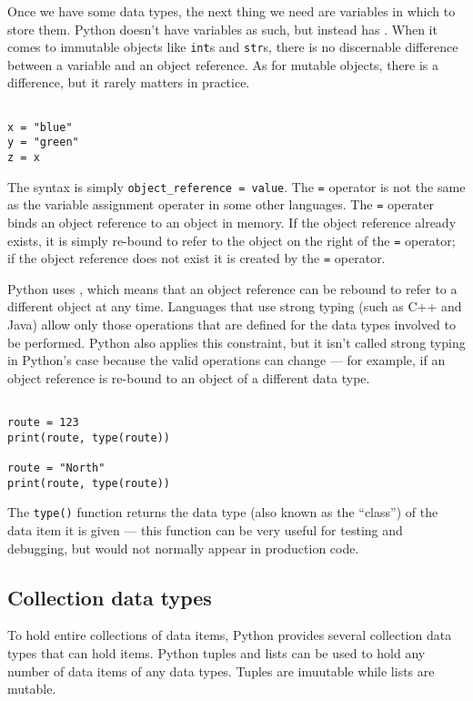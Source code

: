 Once we have some data types, the next thing we need are variables in which to store them.
Python doesn't have variables as such, but instead has .
When it comes to immutable objects like \verb|int|s and \verb|str|s, there is no discernable difference between a variable and an object reference.
As for mutable objects, there is a difference, but it rarely matters in practice.



\begin{lstlisting}

x = "blue"
y = "green"
z = x
\end{lstlisting}


The syntax is simply \verb|object_reference = value|.
The \verb|=| operator is not the same as the variable assignment operater in some other languages.
The \verb|=| operater binds an object reference to an object in memory.
If the object reference already exists, it is simply re-bound to refer to the object on the right of the \verb|=| operator;
if the object reference does not exist it is created by the \verb|=| operator.


Python uses , which means that an object reference can be rebound to refer to a different object at any time.
Languages that use strong typing (such as C++ and Java) allow only those operations that are defined for the data types involved to be performed.
Python also applies this constraint, but it isn’t called strong typing in Python’s case because the valid operations can change --- for example, if an object reference is re-bound to an object of a different data type.

\begin{lstlisting}

route = 123
print(route, type(route))

route = "North"
print(route, type(route))
\end{lstlisting}



The \verb|type()| function returns the data type (also known as the ``class'') of the data item it is given --- this function can be very useful for testing and debugging, but would not normally appear in production code.


\subsection{Collection data types}

To hold entire collections of data items, Python provides several collection data types that can hold items.
Python tuples and lists can be used to hold any number of data items of any data types.
Tuples are imuutable while lists are mutable.


